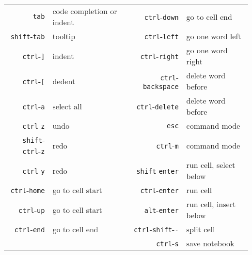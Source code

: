 \documentclass[letterpaper,12pt,oneside]{article}
\begin{document}
\begin{tabular}{rlrl}
 {\tt tab} & code completion or indent &{\tt ctrl}-{\tt down} & go to cell end \\
 {\tt shift}-{\tt tab} &tooltip & {\tt ctrl}-{\tt left} & go one word left \\
 {\tt ctrl}-{\tt ]}&indent & {\tt ctrl}-{\tt right} & go one word right \\
 {\tt ctrl}-{\tt [}&dedent &{\tt ctrl}-{\tt backspace} & delete word before \\
 {\tt ctrl}-{\tt a}&select all &{\tt ctrl}-{\tt delete} & delete word before \\
 {\tt ctrl}-{\tt z}&undo &{\tt esc} & command mode \\
 {\tt shift}-{\tt ctrl}-{\tt z}&redo &{\tt ctrl}-{\tt m} & command mode \\
 {\tt ctrl}-{\tt y}&redo &{\tt shift}-{\tt enter} & run cell, select below \\
 {\tt ctrl}-{\tt home}&go to cell start &{\tt ctrl}-{\tt enter} & run cell \\
 {\tt ctrl}-{\tt up}&go to cell start &{\tt alt}-{\tt enter} & run cell, insert below \\
 {\tt ctrl}-{\tt end}&go to cell end &{\tt ctrl}-{\tt shift}-{\tt -} & split cell \\
 & & {\tt ctrl}-{\tt s} & save notebook \\
\end{tabular}
\end{document}

